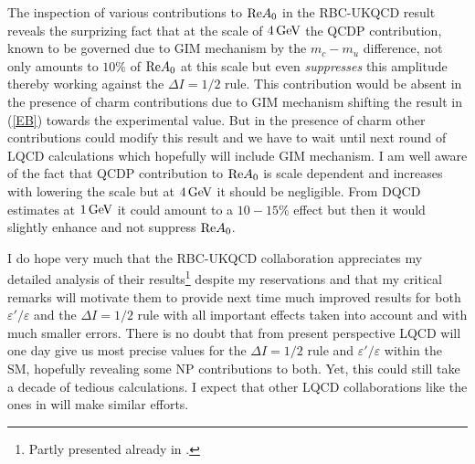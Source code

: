 \documentclass[12pt,a4paper]{article}
\newcommand{\RE}{{\rm Re}}
\newcommand{\gev}{\, {\rm GeV}}
\def\epe{\varepsilon'/\varepsilon}
\begin{document}
The inspection of various contributions to ${\RE A_0}$ in the RBC-UKQCD
  result reveals the surprizing fact
  that at the scale of $4\gev$ the QCDP contribution, known to be governed due
  to GIM mechanism by the $m_c-m_u$ difference,
not only amounts to $10\%$ of ${\RE A_0}$ at this scale but even {\em suppresses} this   amplitude thereby working against the $\Delta I=1/2$ rule. This contribution would   be absent in the presence of charm contributions due to GIM mechanism     shifting the result in (\ref{EB}) towards the experimental value. But in the   presence of charm other contributions could modify this result and
  we have to wait until next round of LQCD calculations which hopefully will include
  GIM mechanism. I am well aware of the fact that QCDP contribution to ${\RE A_0}$ is scale dependent and increases with lowering the scale but
  at $4\gev$ it should be negligible. From DQCD estimates at $1\gev$ it could
  amount to a $10-15\%$ effect but then it would slightly enhance and not suppress ${\RE A_0}$.

  I do hope very much that the RBC-UKQCD collaboration appreciates my
  detailed analysis of their results\footnote{Partly presented already
    in \cite{Aebischer:2020jto,Buras:2020pjp}.}
    despite my reservations and that my critical remarks will motivate them to provide next time much improved results for both $\epe$
  and the $\Delta I=1/2$ rule with all important effects taken into account and with much smaller errors. There is no doubt that from present perspective LQCD will one day give us most precise values for the  $\Delta I=1/2$ rule and $\epe$ within the SM,
  hopefully revealing some NP contributions to both. Yet, this could
  still take a decade of tedious calculations. I expect that other LQCD collaborations like the ones in  \cite{Donini:2020qfu,Ishizuka:2018qbn}  will make similar efforts.
\end{document}
